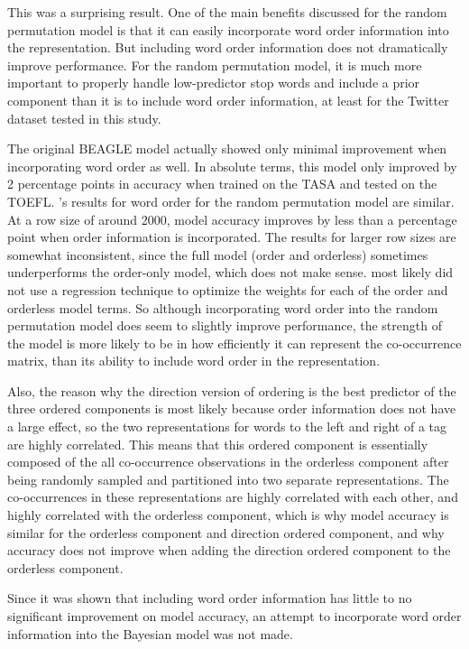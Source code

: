 \documentclass[man,floatsintext,donotrepeattitle]{apa6}
\begin{document}
This was a surprising result.
One of the main benefits discussed for the random permutation model is that it can easily incorporate word order information into the representation.
But including word order information does not dramatically improve performance. 
For the random permutation model, it is much more important to properly handle low-predictor stop words and include a prior component than it is to include word order information,
at least for the Twitter dataset tested in this study.

The original BEAGLE model \parencite{Jones2007} actually showed only minimal improvement when incorporating word order as well.
In absolute terms, this model only improved by 2 percentage points in accuracy when trained on the TASA and tested on the TOEFL.
\textcite{Sahlgren2008}'s results for word order for the random permutation model are similar.
At a row size of around \num{2000}, model accuracy improves by less than a percentage point when order information is incorporated.
The results for larger row sizes are somewhat inconsistent, since the full model (order and orderless) sometimes underperforms the order-only model, which does not make sense.
\textcite{Sahlgren2008} most likely did not use a regression technique to optimize the weights for each of the order and orderless model terms.
So although incorporating word order into the random permutation model does seem to slightly improve performance,
the strength of the model is more likely to be in how efficiently it can represent the co-occurrence matrix, than its ability to include word order in the representation.

Also, the reason why the direction version of ordering is the best predictor of the three ordered components is most likely because order information does not have a large effect,
so the two representations for words to the left and right of a tag are highly correlated.
This means that this ordered component is essentially composed of the all co-occurrence observations in the orderless component after being randomly sampled and partitioned into two separate representations.
The co-occurrences in these representations are highly correlated with each other, and highly correlated with the orderless component,
which is why model accuracy is similar for the orderless component and direction ordered component, and why accuracy does not improve when adding the direction ordered component to the orderless component.

Since it was shown that including word order information has little to no significant improvement on model accuracy, an attempt to incorporate word order information into the Bayesian model was not made.
\end{document}
